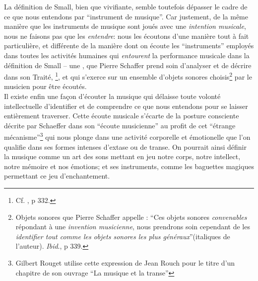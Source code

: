 \indent La définition de Small, bien que vivifiante, semble toutefois dépasser le cadre de ce que nous entendons par ``instrument de musique''. Car justement, de la même manière que les instruments de musique sont joués avec une \textit{intention musicale}, nous ne faisons pas que les \textit{entendre}: nous les écoutons d'une manière tout à fait particulière, et différente de la manière dont on écoute les ``instruments'' employés dans toutes les activités humaines qui \textit{entourent} la performance musicale dans la définition de Small -- une , que Pierre Schaffer prend soin d'analyser et de décrire dans son Traité, \footnote{Cf. \cite{schaeffer_traite_1966}, p 332.}, et qui s'exerce sur un ensemble d'objets sonores choisis\footnote{Objets sonores que Pierre Schaffer appelle : ``Ces objets sonores \textit{convenables} répondant à une \textit{invention musicienne}, nous prendrons soin cependant de les \textit{identifier tout comme les objets sonores les plus généraux}''(italiques de l'auteur). \textit{Ibid}., p 339.} par le musicien pour être écoutés.\\
\indent Il existe enfin une façon d'écouter la musique 
qui délaisse toute volonté intellectuelle d'identifier et de comprendre ce que nous entendons pour se laisser entièrement traverser.
Cette écoute musicale s'écarte de la posture consciente décrite par Schaeffer dans son ``écoute musicienne'' au profit de cet ``étrange mécanisme''\footnote{Gilbert Rouget utilise cette expression de Jean Rouch pour le titre d'un chapitre de son ouvrage ``La musique et la transe''\cite{rouget_musique_1980}} qui nous plonge dans une activité corporelle et émotionelle que l'on qualifie dans ses formes intenses d'extase ou de transe.  On pourrait ainsi définir la musique comme un art des sons mettant en jeu notre corps, notre intellect, notre mémoire et nos émotions; et ses instruments, comme les baguettes magiques permettant ce jeu d'enchantement.




